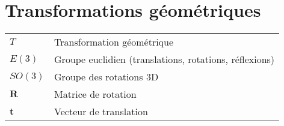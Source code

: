 \section*{Transformations géométriques}

\begin{tabular}{p{2.5cm} p{11cm}}
  \hline
  $T$ & Transformation géométrique\\
  $E(3)$ & Groupe euclidien (translations, rotations, réflexions)\\
  $SO(3)$ & Groupe des rotations 3D\\
  $\mathbf{R}$ & Matrice de rotation\\
  $\mathbf{t}$ & Vecteur de translation\\
  \hline
\end{tabular}
